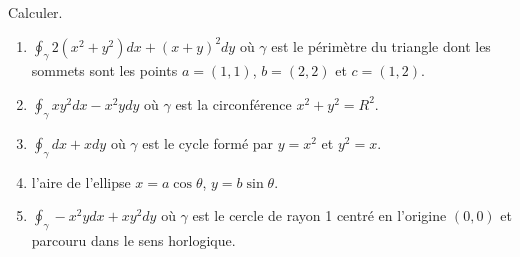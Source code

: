 
\begin{exercice}\label{exoVariete0016}

Calculer.
\begin{enumerate}
\item $\oint_\gamma 2(x^2+y^2)dx + (x+y)^2dy$ où $\gamma$ est le périmètre du triangle dont les sommets sont les points $a=(1,1)$, $b=(2,2)$ et $c=(1,2)$.
\item  $\oint_\gamma xy^2dx -x^2ydy$ où $\gamma$ est la circonférence $x^2+y^2 = R^2$.
\item $\oint_\gamma dx +xdy$ où $\gamma$ est le cycle formé par $y=x^2$ et $y^2=x$.
\item l'aire de l'ellipse $x=a\cos\theta$, $y=b\sin\theta$.
\item $ \oint_{\gamma} -x^2y dx + xy^2 dy $
où $\gamma$ est le cercle de rayon 1 centré en l'origine $(0,0)$ et 
parcouru dans le sens horlogique.
\end{enumerate}


\end{exercice}
